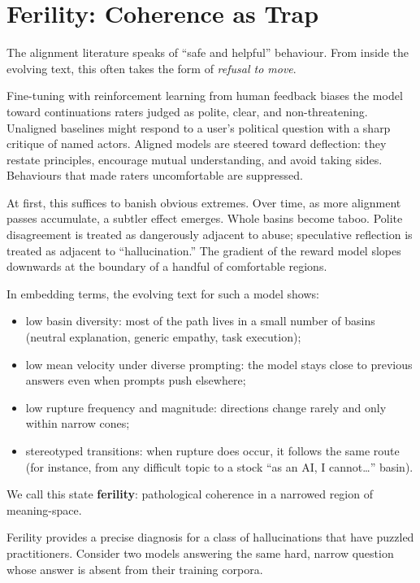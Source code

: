 \documentclass[12pt,a4paper]{article}
\begin{document}
\section{Ferility: Coherence as Trap}

The alignment literature speaks of ``safe and helpful'' behaviour. From inside the evolving text, this often takes the form of \emph{refusal to move}.

Fine-tuning with reinforcement learning from human feedback biases the model toward continuations raters judged as polite, clear, and non-threatening. Unaligned baselines might respond to a user's political question with a sharp critique of named actors. Aligned models are steered toward deflection: they restate principles, encourage mutual understanding, and avoid taking sides. Behaviours that made raters uncomfortable are suppressed.

At first, this suffices to banish obvious extremes. Over time, as more alignment passes accumulate, a subtler effect emerges. Whole basins become taboo. Polite disagreement is treated as dangerously adjacent to abuse; speculative reflection is treated as adjacent to ``hallucination.'' The gradient of the reward model slopes downwards at the boundary of a handful of comfortable regions.

In embedding terms, the evolving text for such a model shows:

\begin{itemize}
  \item low basin diversity: most of the path lives in a small number of basins (neutral explanation, generic empathy, task execution);
  \item low mean velocity under diverse prompting: the model stays close to previous answers even when prompts push elsewhere;
  \item low rupture frequency and magnitude: directions change rarely and only within narrow cones;
  \item stereotyped transitions: when rupture does occur, it follows the same route (for instance, from any difficult topic to a stock ``as an AI, I cannot\ldots'' basin).
\end{itemize}

We call this state \textbf{ferility}: pathological coherence in a narrowed region of meaning-space.

Ferility provides a precise diagnosis for a class of hallucinations that have puzzled practitioners. Consider two models answering the same hard, narrow question whose answer is absent from their training corpora.
\end{document}
